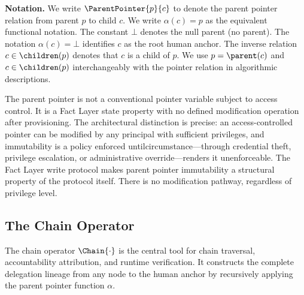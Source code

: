 \bigskip
\noindent\textbf{Notation.} We write $\ParentPointer{p}{c}$ to denote the parent pointer relation from parent $p$ to child $c$. We write $\alpha(c) = p$ as the equivalent functional notation. The constant $\bot$ denotes the null parent (no parent). The notation $\alpha(c) = \bot$ identifies $c$ as the root human anchor. The inverse relation $c \in \children(p)$ denotes that $c$ is a child of $p$. We use $p = \parent(c)$ and $c \in \children(p)$ interchangeably with the pointer relation in algorithmic descriptions.

The parent pointer is not a conventional pointer variable subject to access control. It is a Fact Layer state property with no defined modification operation after provisioning. The architectural distinction is precise: an access-controlled pointer can be modified by any principal with sufficient privileges, and immutability is a policy enforced untilcircumstance---through credential theft, privilege escalation, or administrative override---renders it unenforceable. The Fact Layer write protocol makes parent pointer immutability a structural property of the protocol itself. There is no modification pathway, regardless of privilege level.

\subsection{The Chain Operator}
\label{sec:chain-operator}

The chain operator $\Chain{\cdot}$ is the central tool for chain traversal, accountability attribution, and runtime verification. It constructs the complete delegation lineage from any node to the human anchor by recursively applying the parent pointer function $\alpha$.

